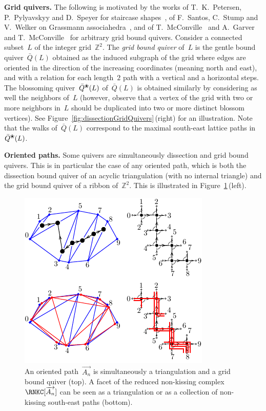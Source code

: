 \documentclass{memo-l}
\theoremstyle{definition}
\newcommand{\Z}{\mathbb{Z}} %
\newcommand{\fref}[1]{Figure~\ref{#1}} %
\newcommand{\darkblue}{\color{darkblue}} %
\newcommand{\defn}[1]{\textsl{\darkblue #1}} %
\newcommand{\para}[1]{\medskip\noindent\textbf{#1.}} %
\DeclareRobustCommand{\exmAn}{\overrightarrow{A_n}} %
\newcommand{\blossom}{^\text{\ding{96}}} %
\begin{document}
\para{Grid quivers}
The following is motivated by the works of T.~K.~Petersen, P.~Pylya\-vskyy and D.~Speyer for staircase shapes~\cite{PetersenPylyavskyySpeyer}, of F.~Santos, C.~Stump and V.~Welker on Grassmann associahedra~\cite{SantosStumpWelker}, and of T.~McConville~\cite{McConville} and A.~Garver and T.~McConville~\cite{GarverMcConville-grid} for arbitrary grid bound quivers.
Consider a connected subset~$L$ of the integer grid~$\Z^2$.
The \defn{grid bound quiver} of~$L$ is the gentle bound quiver~$\bar Q(L)$ obtained as the induced subgraph of the grid where edges are oriented in the direction of the increasing coordinates (meaning north and east), and with a relation for each length~$2$ path with a vertical and a horizontal steps.
The blossoming quiver~$\bar Q\blossom(L)$ of~$\bar Q(L)$ is obtained similarly by considering as well the neighbors of~$L$ (however, observe that a vertex of the grid with two or more neighbors in~$L$ should be duplicated into two or more distinct blossom vertices).
See \fref{fig:dissectionGridQuivers}\,(right) for an illustration.
Note that the walks of~$\bar Q(L)$ correspond to the maximal south-east lattice paths in~$\bar Q\blossom(L)$.

\para{Oriented paths}
Some quivers are simultaneously dissection and grid bound quivers. This is in particular the case of any oriented path, which is both the dissection bound quiver of an acyclic triangulation (with no internal triangle) and the grid bound quiver of a ribbon of~$\Z^2$. This is illustrated in \fref{fig:exmBijectionAssociahedron}\,(left).

\begin{figure}[t]
	\capstart
	\centerline{\includegraphics[scale=1.5]{exmBijectionAssociahedron}}
	\caption{An oriented path~$\exmAn$ is simultaneously a triangulation and a grid bound quiver (top). A facet of the reduced non-kissing complex~$\RNKC[\exmAn]$ can be seen as a triangulation or as a collection of non-kissing south-east paths (bottom).}
	\label{fig:exmBijectionAssociahedron}
\end{figure}
\end{document}
